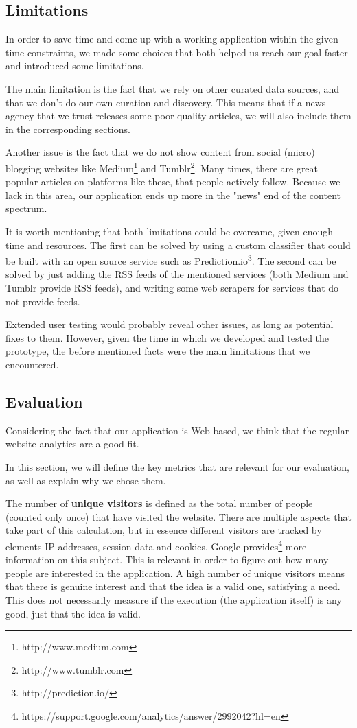 \documentclass{acm_proc_10ptArticle-sp}
\begin{document}
\subsection{Limitations}

In order to save time and come up with a working application within the given time constraints, we made some choices that both helped us reach our goal faster and introduced some limitations.

The main limitation is the fact that we rely on other curated data sources, and that we don't do our own curation and discovery. This means that if a news agency that we trust releases some poor quality articles, we will also include them in the corresponding sections.

Another issue is the fact that we do not show content from social (micro) blogging websites like Medium\footnote{http://www.medium.com} and Tumblr\footnote{http://www.tumblr.com}. Many times, there are great popular articles on platforms like these, that people actively follow. Because we lack in this area, our application ends up more in the "news" end of the content spectrum.

It is worth mentioning that both limitations could be overcame, given enough time and resources. The first can be solved by using a custom classifier that could be built with an open source service such as Prediction.io\footnote{http://prediction.io/}. The second can be solved by just adding the RSS feeds of the mentioned services (both Medium and Tumblr provide RSS feeds), and writing some web scrapers for services that do not provide feeds.

Extended user testing would probably reveal other issues, as long as potential fixes to them. However, given the time in which we developed and tested the prototype, the before mentioned facts were the main limitations that we encountered.

\subsection{Evaluation}

Considering the fact that our application is Web based, we think that the regular website analytics are a good fit.

In this section, we will define the key metrics that are relevant for our evaluation, as well as explain why we chose them.

The number of \textbf{unique visitors} is defined as the total number of people (counted only once) that have visited the website. There are multiple aspects that take part of this calculation, but in essence different visitors are tracked by elements IP addresses, session data and cookies. Google provides\footnote{https://support.google.com/analytics/answer/2992042?hl=en} more information on this subject. This is relevant in order to figure out how many people are interested in the application. A high number of unique visitors means that there is genuine interest and that the idea is a valid one, satisfying a need. This does not necessarily measure if the execution (the application itself) is any good, just that the idea is valid.
\end{document}
